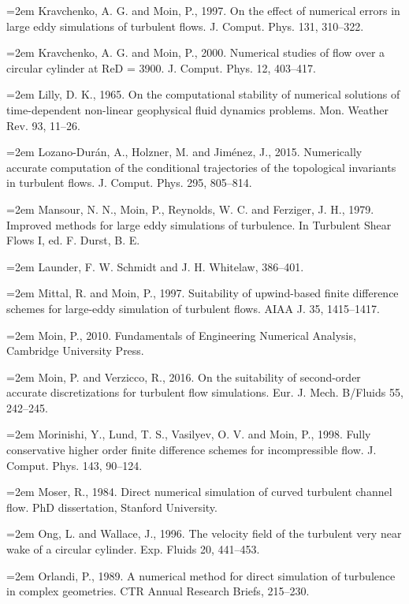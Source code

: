 \documentclass[12pt,a4paper,openany,fontset=none]{ctexbook}
\begin{document}
\par\hangindent=2em Kravchenko, A. G. and Moin, P., 1997. On the effect of numerical errors in large eddy simulations of turbulent flows. J. Comput. Phys. 131, 310–322.
\par\hangindent=2em Kravchenko, A. G. and Moin, P., 2000. Numerical studies of flow over a circular cylinder at ReD = 3900. J. Comput. Phys. 12, 403–417.
\par\hangindent=2em Lilly, D. K., 1965. On the computational stability of numerical solutions of time-dependent non-linear geophysical fluid dynamics problems. Mon. Weather Rev. 93, 11–26.
\par\hangindent=2em Lozano-Durán, A., Holzner, M. and Jiménez, J., 2015. Numerically accurate computation of the conditional trajectories of the topological invariants in turbulent flows. J. Comput. Phys. 295, 805–814.
\par\hangindent=2em Mansour, N. N., Moin, P., Reynolds, W. C. and Ferziger, J. H., 1979. Improved methods for large eddy simulations of turbulence. In Turbulent Shear Flows I, ed. F. Durst, B. E.
\par\hangindent=2em Launder, F. W. Schmidt and J. H. Whitelaw, 386–401.
\par\hangindent=2em Mittal, R. and Moin, P., 1997. Suitability of upwind-based finite difference schemes for large-eddy simulation of turbulent flows. AIAA J. 35, 1415–1417.
\par\hangindent=2em Moin, P., 2010. Fundamentals of Engineering Numerical Analysis, Cambridge University Press.
\par\hangindent=2em Moin, P. and Verzicco, R., 2016. On the suitability of second-order accurate discretizations for turbulent flow simulations. Eur. J. Mech. B/Fluids 55, 242–245.
\par\hangindent=2em Morinishi, Y., Lund, T. S., Vasilyev, O. V. and Moin, P., 1998. Fully conservative higher order finite difference schemes for incompressible flow. J. Comput. Phys. 143, 90–124.
\par\hangindent=2em Moser, R., 1984. Direct numerical simulation of curved turbulent channel flow. PhD dissertation, Stanford University.
\par\hangindent=2em Ong, L. and Wallace, J., 1996. The velocity field of the turbulent very near wake of a circular cylinder. Exp. Fluids 20, 441–453.
\par\hangindent=2em Orlandi, P., 1989. A numerical method for direct simulation of turbulence in complex geometries. CTR Annual Research Briefs, 215–230.
\end{document}

